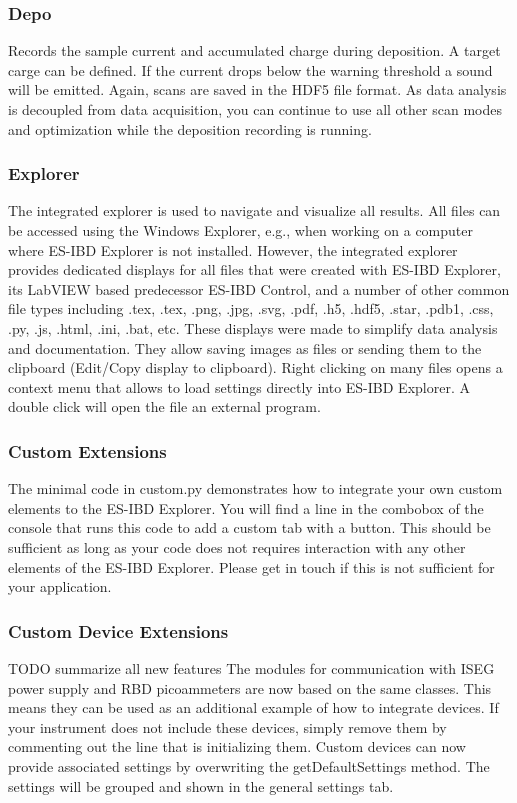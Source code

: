 \documentclass[a4paper,11pt,DIV=13]{scrartcl}
\begin{document}
\subsubsection{Depo}
Records the sample current and accumulated charge during deposition. A target carge can be defined. If the current drops below the warning threshold a sound will be emitted. Again, scans are saved in the HDF5 file format. As data analysis is decoupled from data acquisition, you can continue to use all other scan modes and optimization while the deposition recording is running.

\subsubsection{Explorer}
The integrated explorer is used to navigate and visualize all results. 
All files can be accessed using the Windows Explorer, e.g., when working on a computer where ES-IBD Explorer is not installed. 
However, the integrated explorer provides dedicated displays for all files that were created with ES-IBD Explorer, its LabVIEW based predecessor ES-IBD Control, and a number of other common file types including .tex, .tex, .png, .jpg, .svg, .pdf, .h5, .hdf5, .star, .pdb1, .css, .py, .js, .html, .ini, .bat, etc. These displays were made to simplify data analysis and documentation. They allow saving images as files or sending them to the clipboard (Edit/Copy display to clipboard). Right clicking on many files opens a context menu that allows to load settings directly into ES-IBD Explorer. A double click will open the file an external program.

\subsubsection{Custom Extensions}
The minimal code in custom.py demonstrates how to integrate your own custom elements to the ES-IBD Explorer. You will find a line in the combobox of the console that runs this code to add a custom tab with a button. This should be sufficient as long as your code does not requires interaction with any other elements of the ES-IBD Explorer. Please get in touch if this is not sufficient for your application.

\subsubsection{Custom Device Extensions}
TODO
summarize all new features
The modules for communication with ISEG power supply and RBD picoammeters are now based on the same classes. This means they can be used as an additional example of how to integrate devices. If your instrument does not include these devices, simply remove them by commenting out the line that is initializing them.
Custom devices can now provide associated settings by overwriting the getDefaultSettings method. The settings will be grouped and shown in the general settings tab.
\end{document}
